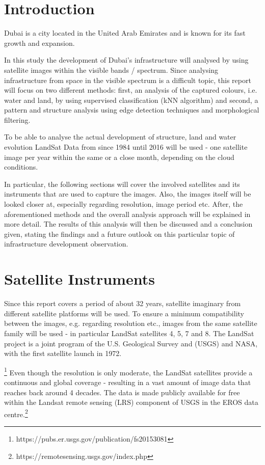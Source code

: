 \section{Introduction}
Dubai is a city located in the United Arab Emirates and is known for its fast growth and expansion.

In this study the development of Dubai's infrastructure will analysed by using satellite images within the visible bands / spectrum.
Since analysing infrastructure from space in the visible spectrum is a difficult topic, this report will focus on two different methods: first, an analysis of the captured colours, i.e. water and land, by using supervised classification (kNN algorithm) and second, a pattern and structure analysis using edge detection techniques and morphological filtering.

To be able to analyse the actual development of structure, land and water evolution LandSat Data from since 1984 until 2016 will be used - one satellite image per year within the same or a close month, depending  on the cloud conditions.

In particular, the following sections will cover the involved satellites and its instruments that are used to capture the images. Also, the images itself will be looked closer at, especially regarding resolution, image period etc. After, the aforementioned methods and the overall analysis approach will be explained in more detail. The results of this analysis will then  be discussed and a conclusion given, stating the findings and a future outlook on this particular topic of infrastructure development observation.

\section{Satellite Instruments}
Since this report covers a period of about 32 years, satellite imaginary from different satellite platforms will be used. To ensure a minimum compatibility between the images, e.g. regarding resolution etc., images from the same satellite family will be used - in particular LandSat satellites 4, 5, 7 and 8.
The LandSat project is a joint program of the U.S. Geological Survey and (USGS) and NASA, with the first satellite launch in 1972.

\footnote{https://pubs.er.usgs.gov/publication/fs20153081}
Even though the resolution is only moderate, the LandSat satellites provide a continuous and global coverage - resulting in a vast amount of image data that reaches back around 4 decades. The data is made publicly available for free within the Landsat remote sensing (LRS) component of USGS in the EROS data centre.\footnote{https://remotesensing.usgs.gov/index.php}

